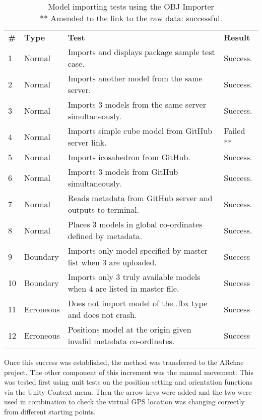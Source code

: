 \documentclass{article}
\begin{document}
\begin{table}[H]
\begin{tabular}{llll}
\textbf{\#} & \textbf{Type} & \textbf{Test}                                               & \textbf{Result} \\
1          & Normal        & Imports and displays package sample test case.              & Success.        \\
2          & Normal        & Imports another model from the same server.                 & Success.        \\
3          & Normal        & Imports 3 models from the same server simultaneously.       & Success.        \\
4  & Normal    & Imports simple cube model from GitHub server link.                      & Failed ** \\
5          & Normal        & Imports icosahedron from GitHub.                            & Success.        \\
6          & Normal        & Imports 3 models from GitHub simultaneously.                & Success.        \\
7          & Normal        & Reads metadata from GitHub server and outputs to terminal.  & Success.        \\
8          & Normal        & Places 3 models in global co-ordinates defined by metadata. & Success.        \\
9          & Boundary      & Imports only model specified by master list when 3 are uploaded.   & Success         \\
10 & Boundary  & Imports only 3 truly available models when 4 are listed in master file. & Success                                                           \\
11         & Erroneous     & Does not import model of the .fbx type and does not crash.  & Success         \\
12 & Erroneous & Positions model at the origin given invalid metadata co-ordinates.      & Success 
\end{tabular}
\caption{Model importing tests using the OBJ Importer \\ ** Amended to the link to the raw data: successful.}
\end{table}

Once this success was established, the method was transferred to the ARchae project. The other component of this increment was the manual movement. This was tested first using unit tests on the position setting and orientation functions via the Unity Context menu. Then the arrow keys were added and the two were used in combination to check the virtual GPS location was changing correctly from different starting points.
\end{document}
